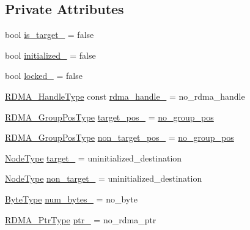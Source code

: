 \subsection*{Private Attributes}
\begin{DoxyCompactItemize}
\item 
bool \hyperlink{structvt_1_1rdma_1_1_channel_a377666458809a8384f298fd7c47f3172}{is\+\_\+target\+\_\+} = false
\item 
bool \hyperlink{structvt_1_1rdma_1_1_channel_a7aa5da1e8d8221db620fa3740f136d9b}{initialized\+\_\+} = false
\item 
bool \hyperlink{structvt_1_1rdma_1_1_channel_a788909186ab3c715dd5b44fa8314c5c6}{locked\+\_\+} = false
\item 
\hyperlink{namespacevt_a10442579ec4e7ebef223818e64bcf908}{R\+D\+M\+A\+\_\+\+Handle\+Type} const \hyperlink{structvt_1_1rdma_1_1_channel_afce2d3103af1c380f955972e9335c270}{rdma\+\_\+handle\+\_\+} = no\+\_\+rdma\+\_\+handle
\item 
\hyperlink{structvt_1_1rdma_1_1_channel_ae67759ab26cc035489edd369ae207cfc}{R\+D\+M\+A\+\_\+\+Group\+Pos\+Type} \hyperlink{structvt_1_1rdma_1_1_channel_a2d500c08cfff04453e181002f1d16cad}{target\+\_\+pos\+\_\+} = \hyperlink{structvt_1_1rdma_1_1_channel_a5b8e4d79d272951f51a9856705110d24}{no\+\_\+group\+\_\+pos}
\item 
\hyperlink{structvt_1_1rdma_1_1_channel_ae67759ab26cc035489edd369ae207cfc}{R\+D\+M\+A\+\_\+\+Group\+Pos\+Type} \hyperlink{structvt_1_1rdma_1_1_channel_aab4161123aa98085de1b2fbab5f76ec8}{non\+\_\+target\+\_\+pos\+\_\+} = \hyperlink{structvt_1_1rdma_1_1_channel_a5b8e4d79d272951f51a9856705110d24}{no\+\_\+group\+\_\+pos}
\item 
\hyperlink{namespacevt_a866da9d0efc19c0a1ce79e9e492f47e2}{Node\+Type} \hyperlink{structvt_1_1rdma_1_1_channel_a50932f1ef290b73c7d3010e5e5cd24f7}{target\+\_\+} = uninitialized\+\_\+destination
\item 
\hyperlink{namespacevt_a866da9d0efc19c0a1ce79e9e492f47e2}{Node\+Type} \hyperlink{structvt_1_1rdma_1_1_channel_aea0aa91cd0ab35f294ece2c16b46f99f}{non\+\_\+target\+\_\+} = uninitialized\+\_\+destination
\item 
\hyperlink{namespacevt_aab8d55968084610ce3b17057981e9300}{Byte\+Type} \hyperlink{structvt_1_1rdma_1_1_channel_af2828aad3c2db3071ba353645561922a}{num\+\_\+bytes\+\_\+} = no\+\_\+byte
\item 
\hyperlink{namespacevt_a9e2c953286c7616f7c218e9951790776}{R\+D\+M\+A\+\_\+\+Ptr\+Type} \hyperlink{structvt_1_1rdma_1_1_channel_a0e894313317bd3469e8dd16db791cc44}{ptr\+\_\+} = no\+\_\+rdma\+\_\+ptr

\end{DoxyCompactItemize}
